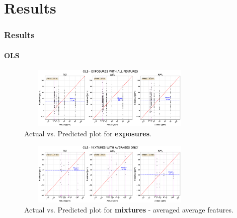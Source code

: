 \documentclass{beamer}
\begin{document}
\section{Results}
\begin{frame}
	\frametitle{Results}
	\framesubtitle{OLS}
		
		\begin{figure}[b]
			\includegraphics[width=0.8\textwidth, height = 3cm, keepaspectratio]{../../figures/ols-act-vs-pred.png}
			\caption{Actual vs. Predicted plot for \textbf{exposures}.}
			\label{fig:ols-exposures} 
		\end{figure}
		
		\begin{figure}[b]
			\includegraphics[width=0.8\textwidth, height = 3cm, keepaspectratio]{../../figures/ols-avg-act-vs-pred.png}
			\caption{Actual vs. Predicted plot for \textbf{mixtures} - averaged average features.}
			\label{fig:ols-averaged}
		\end{figure}

	
\end{frame}
\end{document}
